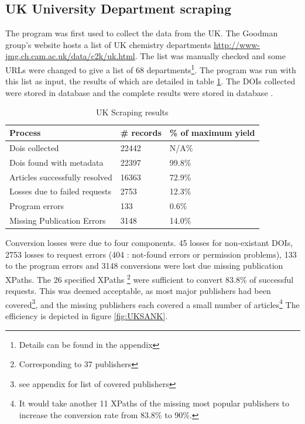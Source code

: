 \subsection{UK University Department scraping}
\label{sec:UKSCRAPE}
The program was first used to collect the data from the UK. The Goodman group's website hosts a list of UK chemistry departments \url{http://www-jmg.ch.cam.ac.uk/data/c2k/uk.html}. The list was manually checked and some URLs were changed to give a list of 68 departments\footnote{Details can be found in the appendix}. The program was run with this list as input, the results of which are detailed in table \ref{tab:UKSCRAPERES}. The DOIs collected were stored in database  and the complete results were stored in database .
\begin{table}[h!]
\caption{UK Scraping results}
\label{tab:UKSCRAPERES}

\begin{center}
\begin{tabular}{||l|l|l||}
\hline
Process & \# records & \% of maximum yield\\
\hline
Dois collected & 22442 & N/A\%\\
Dois found with metadata & 22397 & 99.8\%\\
Articles successfully resolved & 16363 & 72.9\%\\
Losses due to failed requests & 2753 & 12.3\%\\
Program errors & 133 & 0.6\%\\
Missing Publication Errors & 3148 & 14.0\% \\
\hline
\end{tabular}
\end{center}
\end{table}
Conversion losses were due to four components. 45 losses for non-existant DOIs, 2753 losses to request errors (404 : not-found errors or permission problems), 133 to the program errors and 3148 conversions were lost due missing publication XPaths. The 26 specified XPaths \footnote{Corresponding to 37 publishers} were sufficient to convert 83.8\% of successful requests. This was deemed acceptable, as most major publishers had been covered\footnote{see appendix for list of covered publishers}, and the missing publishers each covered a small number of articles\footnote{It would take another 11 XPaths of the missing most popular publishers to increase the conversion rate from 83.8\% to 90\%.}
The efficiency is depicted in figure \ref{fig:UKSANK}.

